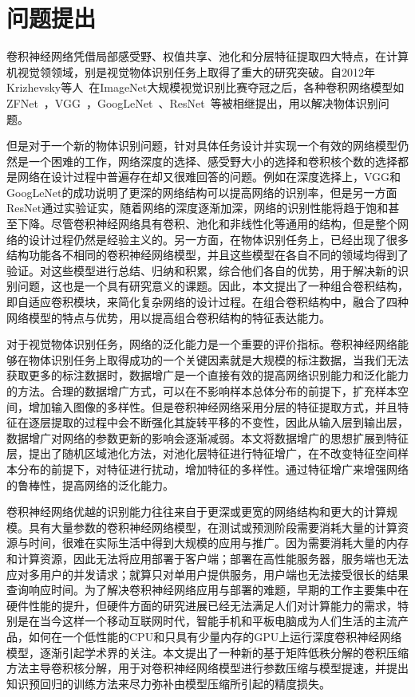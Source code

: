 \section{问题提出}
\label{sec:question}

卷积神经网络凭借局部感受野、权值共享、池化和分层特征提取四大特点，在计算机视觉领领域，别是视觉物体识别任务上取得了重大的研究突破。自2012年Krizhevsky等人~\cite{krizhevsky2012imagenet}在ImageNet大规模视觉识别比赛夺冠之后，各种卷积网络模型如ZFNet~\cite{zeiler2014visualizing}，VGG~\cite{simonyan2014very}，GoogLeNet~\cite{szegedy2014going,szegedy2015rethinking,szegedy2016inception}、ResNet~\cite{he2015deep}等被相继提出，用以解决物体识别问题。

但是对于一个新的物体识别问题，针对具体任务设计并实现一个有效的网络模型仍然是一个困难的工作，网络深度的选择、感受野大小的选择和卷积核个数的选择都是网络在设计过程中普遍存在却又很难回答的问题。例如在深度选择上，VGG和GoogLeNet的成功说明了更深的网络结构可以提高网络的识别率，但是另一方面ResNet通过实验证实，随着网络的深度逐渐加深，网络的识别性能将趋于饱和甚至下降。尽管卷积神经网络具有卷积、池化和非线性化等通用的结构，但是整个网络的设计过程仍然是经验主义的。另一方面，在物体识别任务上，已经出现了很多结构功能各不相同的卷积神经网络模型，并且这些模型在各自不同的领域均得到了验证。对这些模型进行总结、归纳和积累，综合他们各自的优势，用于解决新的识别问题，这也是一个具有研究意义的课题。因此，本文提出了一种组合卷积结构，即自适应卷积模块，来简化复杂网络的设计过程。在组合卷积结构中，融合了四种网络模型的特点与优势，用以提高组合卷积结构的特征表达能力。

对于视觉物体识别任务，网络的泛化能力是一个重要的评价指标。卷积神经网络能够在物体识别任务上取得成功的一个关键因素就是大规模的标注数据，当我们无法获取更多的标注数据时，数据增广是一个直接有效的提高网络识别能力和泛化能力的方法。合理的数据增广方式，可以在不影响样本总体分布的前提下，扩充样本空间，增加输入图像的多样性。但是卷积神经网络采用分层的特征提取方式，并且特征在逐层提取的过程中会不断强化其旋转平移的不变性，因此从输入层到输出层，数据增广对网络的参数更新的影响会逐渐减弱。本文将数据增广的思想扩展到特征层，提出了随机区域池化方法，对池化层特征进行特征增广，在不改变特征空间样本分布的前提下，对特征进行扰动，增加特征的多样性。通过特征增广来增强网络的鲁棒性，提高网络的泛化能力。

卷积神经网络优越的识别能力往往来自于更深或更宽的网络结构和更大的计算规模。具有大量参数的卷积神经网络模型，在测试或预测阶段需要消耗大量的计算资源与时间，很难在实际生活中得到大规模的应用与推广。因为需要消耗大量的内存和计算资源，因此无法将应用部署于客户端；部署在高性能服务器，服务端也无法应对多用户的并发请求；就算只对单用户提供服务，用户端也无法接受很长的结果查询响应时间。为了解决卷积神经网络应用与部署的难题，早期的工作主要集中在硬件性能的提升，但硬件方面的研究进展已经无法满足人们对计算能力的需求，特别是在当今这样一个移动互联网时代，智能手机和平板电脑成为人们生活的主流产品，如何在一个低性能的CPU和只具有少量内存的GPU上运行深度卷积神经网络模型，逐渐引起学术界的关注。本文提出了一种新的基于矩阵低秩分解的卷积压缩方法主导卷积核分解，用于对卷积神经网络模型进行参数压缩与模型提速，并提出知识预回归的训练方法来尽力弥补由模型压缩所引起的精度损失。



